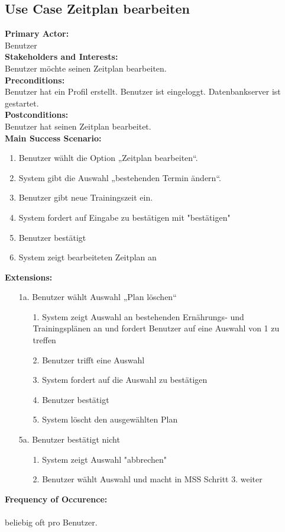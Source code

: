 \documentclass[12pt,a4paper,onecolumn]{article}
\begin{document}
\subsection{Use Case Zeitplan bearbeiten}
\textbf{Primary Actor:}\\ Benutzer\\
\textbf{Stakeholders and Interests:}\\
Benutzer möchte seinen Zeitplan bearbeiten.\\
\textbf{Preconditions:} \\ Benutzer hat ein Profil erstellt. Benutzer ist eingeloggt. Datenbankserver ist gestartet.\\
\textbf{Postconditions:}\\Benutzer hat seinen Zeitplan bearbeitet.\\
\textbf{Main Success Scenario:}
\begin{enumerate}
    \item Benutzer wählt die Option „Zeitplan bearbeiten“.
    \item System gibt die Auswahl „bestehenden Termin ändern“.
    \item Benutzer gibt neue Trainingszeit ein.
    \item System fordert auf Eingabe zu bestätigen mit "bestätigen"
    \item Benutzer bestätigt
    \item System zeigt bearbeiteten Zeitplan an
\end{enumerate}
\textbf{Extensions:}
\begin{enumerate}
    \item [1a.]  Benutzer wählt Auswahl „Plan löschen“
    \begin{enumerate}
        \item[1.]System zeigt Auswahl an bestehenden Ernährungs- und Trainingsplänen an und fordert Benutzer auf eine Auswahl von 1 zu treffen
        \item[2.]Benutzer trifft eine Auswahl 
        \item[3.]System fordert auf die Auswahl zu bestätigen
        \item[4.]Benutzer bestätigt
        \item[5.]System löscht den ausgewählten Plan 
    \end{enumerate}
    \item [5a.]Benutzer bestätigt nicht
    \begin{enumerate}
        \item[1.]System zeigt Auswahl "abbrechen"
    \item[2.]Benutzer wählt Auswahl und macht in MSS Schritt 3. weiter
    \end{enumerate}
\end{enumerate}
\textbf{Frequency of Occurence:}\\ \\
beliebig oft pro Benutzer.
\end{document}
